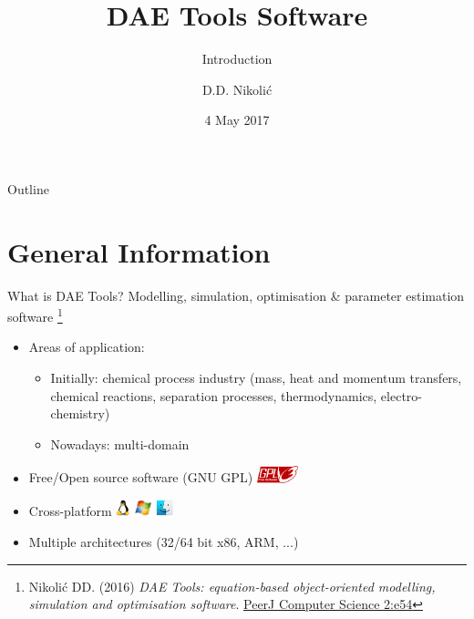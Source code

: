 \documentclass[compress,newPxFont,sthlmFooter]{beamer}
\title{DAE Tools Software}
\subtitle{Introduction}
\author{D.D. Nikolić}
\institute
{
  DAE Tools Project, \url{http://www.daetools.com}
}
\date{4 May 2017}
\begin{document}
\maketitle

\begin{frame}{Outline}
\tableofcontents[sectionstyle=show, 
                 subsectionstyle=hide]
\end{frame} 

\section{General Information}

\begin{frame}{What is DAE Tools?} 
\alert{Modelling}, \alert{simulation}, \alert{optimisation} \& \alert{parameter estimation} software
\footnote{\tiny{Nikolić DD. (2016) \textit{DAE Tools: equation-based object-oriented modelling, simulation and optimisation software}.
          \href{https://doi.org/10.7717/peerj-cs.54}{PeerJ Computer Science 2:e54}}
         }

\begin{itemize}
  \item Areas of application:
    \begin{itemize}
      \item Initially: \alert{chemical process industry} (mass, heat and momentum transfers, chemical reactions, 
                                                          separation processes, thermodynamics, electro-chemistry)
      \item Nowadays: \alert{multi-domain}
    \end{itemize}
  \item \alert{Free/Open source software} (GNU GPL) \includegraphics[align=c,height=1.3em]{gnu_gpl3.png}
  \item \alert{Cross-platform} \includegraphics[align=c,height=1.3em]{linux.png} 
                               \includegraphics[align=c,height=1.3em]{windows.png} 
                               \includegraphics[align=c,height=1.3em]{macos.png}
  \item \alert{Multiple architectures} (32/64 bit x86, ARM, ...)
\end{itemize}
\end{frame}
\end{document}
